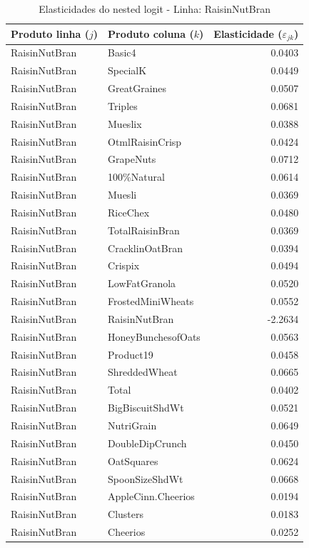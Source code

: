 \begingroup
\begin{table}[H]
\centering
\caption{Elasticidades do nested logit - Linha: RaisinNutBran}
\label{tab:elas-nested-raisinnutbran}
\small
\begin{tabular}{llr}
\toprule
Produto linha ($j$) & Produto coluna ($k$) & Elasticidade ($\varepsilon_{jk}$) \\
\midrule
RaisinNutBran & Basic4 & 0.0403 \\
RaisinNutBran & SpecialK & 0.0449 \\
RaisinNutBran & GreatGraines & 0.0507 \\
RaisinNutBran & Triples & 0.0681 \\
RaisinNutBran & Mueslix & 0.0388 \\
RaisinNutBran & OtmlRaisinCrisp & 0.0424 \\
RaisinNutBran & GrapeNuts & 0.0712 \\
RaisinNutBran & 100\%Natural & 0.0614 \\
RaisinNutBran & Muesli & 0.0369 \\
RaisinNutBran & RiceChex & 0.0480 \\
RaisinNutBran & TotalRaisinBran & 0.0369 \\
RaisinNutBran & CracklinOatBran & 0.0394 \\
RaisinNutBran & Crispix & 0.0494 \\
RaisinNutBran & LowFatGranola & 0.0520 \\
RaisinNutBran & FrostedMiniWheats & 0.0552 \\
RaisinNutBran & RaisinNutBran & -2.2634 \\
RaisinNutBran & HoneyBunchesofOats & 0.0563 \\
RaisinNutBran & Product19 & 0.0458 \\
RaisinNutBran & ShreddedWheat & 0.0665 \\
RaisinNutBran & Total & 0.0402 \\
RaisinNutBran & BigBiscuitShdWt & 0.0521 \\
RaisinNutBran & NutriGrain & 0.0649 \\
RaisinNutBran & DoubleDipCrunch & 0.0450 \\
RaisinNutBran & OatSquares & 0.0624 \\
RaisinNutBran & SpoonSizeShdWt & 0.0668 \\
RaisinNutBran & AppleCinn.Cheerios & 0.0194 \\
RaisinNutBran & Clusters & 0.0183 \\
RaisinNutBran & Cheerios & 0.0252 \\

\end{tabular}
\end{table}
